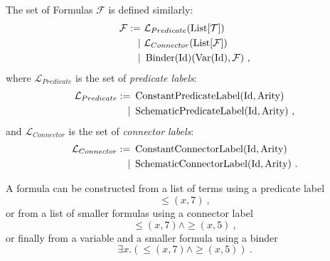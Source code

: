 \begin{defin}[Formulas]
  The set of Formulas $\mathcal{F}$ is defined similarly:
  \begin{align}
      \mathcal{F} := & ~\mathcal{L}_{Predicate}(\operatorname{List}[\mathcal{T}]) \\
      \mid & ~\mathcal{L}_{Connector}(\operatorname{List}[\mathcal{F}]) \\
      \mid & ~\operatorname{Binder}(\textnormal{Id})(\operatorname{Var}(\textnormal{Id}), \mathcal{F})~,
  \end{align}
  where $\mathcal{L}_{Predicate}$ is the set of \textit{predicate labels}:
  \begin{align}
      \mathcal{L}_{Predicate} := & ~\operatorname{ConstantPredicateLabel}(\textnormal{Id}, \textnormal{Arity})\\
      \mid & ~\operatorname{SchematicPredicateLabel}(\textnormal{Id}, \textnormal{Arity})~,
  \end{align}
  and $\mathcal{L}_{Connector}$ is the set of \textit{connector labels}:
  \begin{align}
      \mathcal{L}_{Connector} := & ~\operatorname{ConstantConnectorLabel}(\textnormal{Id}, \textnormal{Arity})\\
      \mid & ~\operatorname{SchematicConnectorLabel}(\textnormal{Id}, \textnormal{Arity})~.
  \end{align}

  A formula can be constructed from a list of terms using a predicate label
  $$
    {\leq}(x, 7)~,
  $$
  or from a list of smaller formulas using a connector label
  $$
    {\leq}(x, 7) \land {\geq}(x, 5)~,
  $$
  or finally from a variable and a smaller formula using a binder
  $$
    \exists x. \left({\leq}(x, 7) \land {\geq}(x, 5)\right)~.
  $$


\end{defin}
